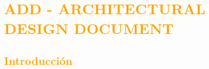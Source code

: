 \chapter{\textcolor{orange}{ADD - ARCHITECTURAL DESIGN DOCUMENT}}
\newpage


\section{\textcolor{orange}{Introducción}}
